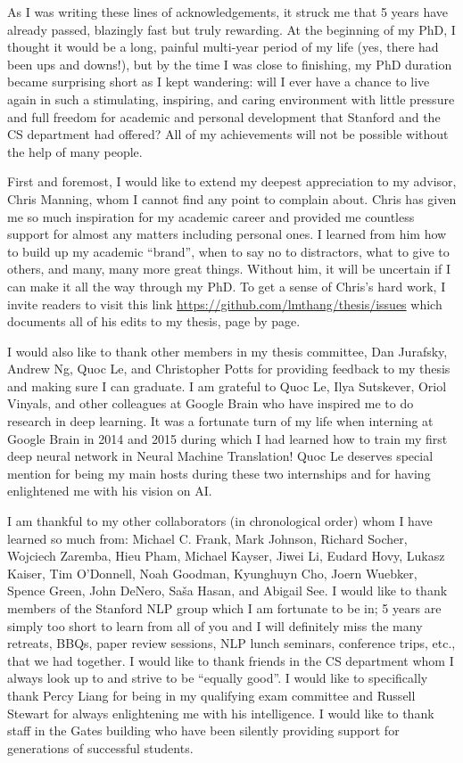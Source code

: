 As I was writing these lines of acknowledgements, it struck me that 5 years have
already passed, blazingly fast but truly rewarding. At the beginning of my PhD,
I thought it would be a long, painful multi-year period of my life (yes, there
had been ups and downs!), but by the time I was close to finishing, my PhD
duration became surprising short as I kept wandering: will I ever have a chance
to live again in such a stimulating, inspiring, and caring environment with
little pressure and full freedom for academic and personal development that
Stanford and the CS department had offered? All of my achievements will not be
possible without the help of many people.

First and foremost, I would like to extend my deepest appreciation to my
advisor, Chris Manning, whom I cannot find any point to complain about. Chris
has given me so much inspiration for my academic career and provided me
countless support for almost any matters including personal ones. I learned from
him how to build up my academic ``brand'', when to say no to distractors,
what to give to others, and many, many more great things.
Without him, it will be uncertain
if I can make it all the way through my PhD. To get a sense of Chris's hard work,
I invite readers to visit this link
\url{https://github.com/lmthang/thesis/issues} which documents all of his edits
to my thesis, page by page.

I would also like to thank other members in my thesis committee, Dan Jurafsky,
Andrew Ng, Quoc Le, and Christopher Potts for providing feedback to my thesis
and making sure I can graduate. I am grateful to Quoc Le, Ilya Sutskever,
Oriol Vinyals, and other colleagues at Google Brain who have inspired me to do
research in deep learning. It was a fortunate turn of my life when interning at
Google Brain in 2014 and 2015 during which I had learned how to train my first
deep neural network in Neural Machine Translation! Quoc Le deserves special
mention for being my main hosts during these two internships and for having
enlightened me with his vision on AI.


I am thankful to my other collaborators (in chronological order) whom I have
learned so much from: Michael C. Frank, Mark Johnson, Richard Socher, Wojciech
Zaremba, Hieu Pham, Michael Kayser, Jiwei Li, Eudard Hovy, Lukasz Kaiser, Tim
O'Donnell, Noah Goodman, Kyunghuyn Cho, Joern Wuebker, Spence Green, John
DeNero, Sa\v{s}a Hasan, and Abigail See. I would like to thank members of the
Stanford NLP group which I am fortunate to be in; 5 years are simply too short
to learn from all of you and I will definitely miss the many retreats, BBQs,
paper review sessions, NLP lunch seminars, conference trips, etc., that we had
together. I would like to thank friends in the CS department whom I always look
up to and strive to be ``equally good''. I would like to specifically thank Percy
Liang for being in my qualifying exam committee and Russell Stewart for always
enlightening me with his intelligence. I would like to thank staff in the Gates
building who have been silently providing support for generations of successful
students.

